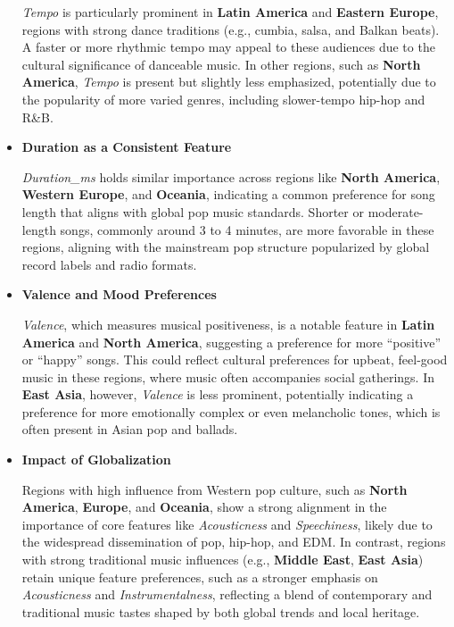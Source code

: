 \begin{itemize}
\textit{Tempo} is particularly prominent in \textbf{Latin America} and \textbf{Eastern Europe}, regions with strong dance traditions (e.g., cumbia, salsa, and Balkan beats). A faster or more rhythmic tempo may appeal to these audiences due to the cultural significance of danceable music.
In other regions, such as \textbf{North America}, \textit{Tempo} is present but slightly less emphasized, potentially due to the popularity of more varied genres, including slower-tempo hip-hop and R\&B.


\item\textbf{Duration as a Consistent Feature}

\textit{Duration\_ms} holds similar importance across regions like \textbf{North America}, \textbf{Western Europe}, and \textbf{Oceania}, indicating a common preference for song length that aligns with global pop music standards.
Shorter or moderate-length songs, commonly around 3 to 4 minutes, are more favorable in these regions, aligning with the mainstream pop structure popularized by global record labels and radio formats.


\item\textbf{Valence and Mood Preferences}

\textit{Valence}, which measures musical positiveness, is a notable feature in \textbf{Latin America} and \textbf{North America}, suggesting a preference for more “positive” or “happy” songs. This could reflect cultural preferences for upbeat, feel-good music in these regions, where music often accompanies social gatherings.
In \textbf{East Asia}, however, \textit{Valence} is less prominent, potentially indicating a preference for more emotionally complex or even melancholic tones, which is often present in Asian pop and ballads.


\item\textbf{Impact of Globalization}

Regions with high influence from Western pop culture, such as \textbf{North America}, \textbf{Europe}, and \textbf{Oceania}, show a strong alignment in the importance of core features like \textit{Acousticness} and \textit{Speechiness}, likely due to the widespread dissemination of pop, hip-hop, and EDM.
In contrast, regions with strong traditional music influences (e.g., \textbf{Middle East}, \textbf{East Asia}) retain unique feature preferences, such as a stronger emphasis on \textit{Acousticness} and \textit{Instrumentalness}, reflecting a blend of contemporary and traditional music tastes shaped by both global trends and local heritage.


\end{itemize}
